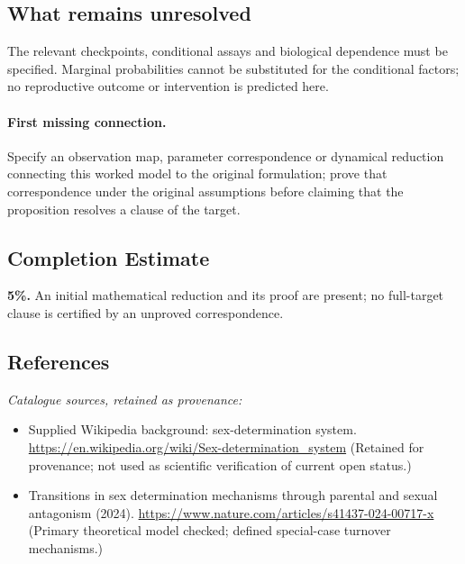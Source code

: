 \documentclass[11pt]{article}
\begin{document}
\subsection{What remains unresolved}
The relevant checkpoints, conditional assays and biological dependence must be specified. Marginal probabilities cannot be substituted for the conditional factors; no reproductive outcome or intervention is predicted here.
\paragraph{First missing connection.} Specify an observation map, parameter correspondence or dynamical reduction connecting this worked model to the original formulation; prove that correspondence under the original assumptions before claiming that the proposition resolves a clause of the target.
\subsection{Completion Estimate}
\textbf{5\%.} An initial mathematical reduction and its proof are present; no full-target clause is certified by an unproved correspondence.
\subsection{References}
\noindent\emph{Catalogue sources, retained as provenance:}
\begin{itemize}
\item Supplied Wikipedia background: sex-determination system. \url{https://en.wikipedia.org/wiki/Sex-determination_system} (Retained for provenance; not used as scientific verification of current open status.)
\item Transitions in sex determination mechanisms through parental and sexual antagonism (2024). \url{https://www.nature.com/articles/s41437-024-00717-x} (Primary theoretical model checked; defined special-case turnover mechanisms.)
\end{itemize}
\clearpage


\appendix
\end{document}
